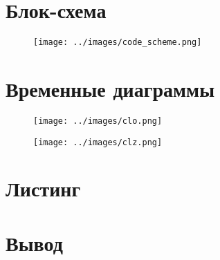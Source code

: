 \documentclass[a4paper, 10pt]{article}
\begin{document}
     \section*{Блок-схема}
        \begin{landscape}
            \begin{figure}[ht]
                \texttt{[image: ../images/code\_scheme.png]}
            \end{figure}
        \end{landscape}
     \section*{Временные диаграммы}
        \begin{figure}[h!]
            \texttt{[image: ../images/clo.png]}
        \end{figure}
        \begin{figure}[h!]
            \texttt{[image: ../images/clz.png]}
        \end{figure}

     \section*{Листинг}
        

    \section*{Вывод}
\end{document}
